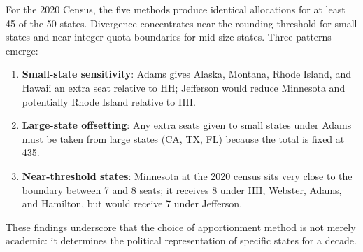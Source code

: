 For the 2020 Census, the five methods produce identical allocations for
at least 45 of the 50 states.
Divergence concentrates near the rounding threshold for small states
and near integer-quota boundaries for mid-size states.
Three patterns emerge:
\begin{enumerate}
  \item \textbf{Small-state sensitivity}: Adams gives Alaska, Montana,
    Rhode Island, and Hawaii an extra seat relative to HH;
    Jefferson would reduce Minnesota and potentially Rhode Island
    relative to HH.
  \item \textbf{Large-state offsetting}: Any extra seats given to small
    states under Adams must be taken from large states (CA, TX, FL)
    because the total is fixed at 435.
  \item \textbf{Near-threshold states}: Minnesota at the 2020 census
    sits very close to the boundary between 7 and 8 seats;
    it receives 8 under HH, Webster, Adams, and Hamilton,
    but would receive 7 under Jefferson.
\end{enumerate}
These findings underscore that the choice of apportionment method is
not merely academic: it determines the political representation of
specific states for a decade.
